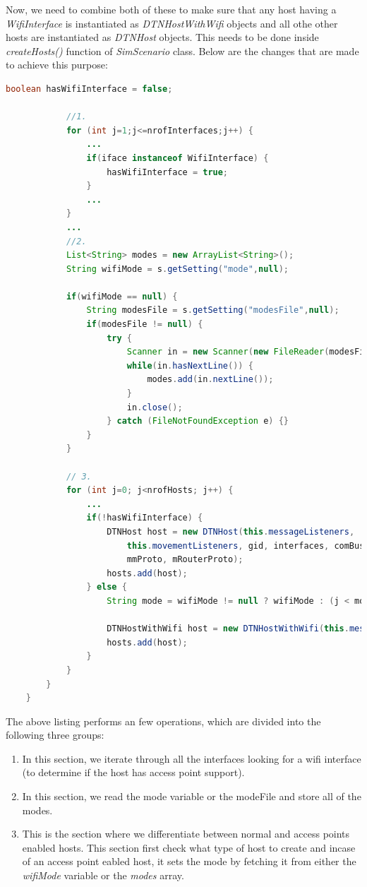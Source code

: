 Now, we need to combine both of these to make sure that any host having a \textit{WifiInterface} is instantiated as \textit{DTNHostWithWifi} objects and all othe other hosts are instantiated as \textit{DTNHost} objects. This needs to be done inside \textit{createHosts()} function of \textit{SimScenario} class. Below are the changes that are made to achieve this purpose:
\vspace{3mm}
\begin{lstlisting}[language=java]
			boolean hasWifiInterface = false;

			//1.
			for (int j=1;j<=nrofInterfaces;j++) {
				...
				if(iface instanceof WifiInterface) {
					hasWifiInterface = true;
				}
				...
			}
			...
			//2.
			List<String> modes = new ArrayList<String>();
			String wifiMode = s.getSetting("mode",null);

			if(wifiMode == null) {
				String modesFile = s.getSetting("modesFile",null);
				if(modesFile != null) {
					try {
						Scanner in = new Scanner(new FileReader(modesFile));
						while(in.hasNextLine()) {
							modes.add(in.nextLine());
						}
						in.close();
					} catch (FileNotFoundException e) {}
				}
			}

			// 3.
			for (int j=0; j<nrofHosts; j++) {
				...
				if(!hasWifiInterface) {
					DTNHost host = new DTNHost(this.messageListeners,
						this.movementListeners,	gid, interfaces, comBus,
						mmProto, mRouterProto);
					hosts.add(host);
				} else {
					String mode = wifiMode != null ? wifiMode : (j < modes.size() ? modes.get(j) : "");

					DTNHostWithWifi host = new DTNHostWithWifi(this.messageListeners, this.movementListeners, gid, interfaces, comBus, mmProto, mRouterProto,  mode: mode);
					hosts.add(host);
				}
			}
		}
	}
\end{lstlisting}
\vspace{3mm}
The above listing performs an few operations, which are divided into the following three groups:
\begin{enumerate}
	\item In this section, we iterate through all the interfaces looking for a wifi interface (to determine if the host has access point support).
	\item In this section, we read the mode variable or the modeFile and store all of the modes.
	\item This is the section where we differentiate between normal and access points enabled hosts. This section first check what type of host to create and incase of an access point eabled host, it sets the mode by fetching it from either the \textit{wifiMode} variable or the \textit{modes} array.
\end{enumerate}
